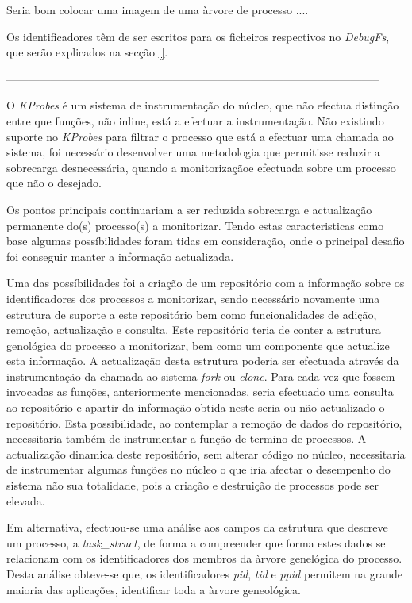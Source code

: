 Seria bom colocar uma imagem de uma àrvore de processo .... 

Os identificadores têm de ser escritos para os ficheiros respectivos no \textit{DebugFs}, que serão explicados na secção \ref{}.

-----------------------------------------------------------------------------------------------------

O \textit{KProbes} é um sistema de instrumentação do núcleo, que não efectua distinção entre que funções, não inline, está a efectuar a instrumentação.
Não existindo suporte no \textit{KProbes} para filtrar o processo que está a efectuar uma chamada ao sistema, foi necessário desenvolver uma metodologia que permitisse reduzir a sobrecarga desnecessária, quando a monitorizaçãoe efectuada sobre um processo que não o desejado.

Os pontos principais continuariam a ser reduzida sobrecarga e actualização permanente do(s) processo(s) a monitorizar.
Tendo estas caracteristicas como base algumas possíbilidades foram tidas em consideração, onde o principal desafio foi conseguir manter a informação actualizada.

Uma das possíbilidades foi a criação de um repositório com a informação sobre os identificadores dos processos a monitorizar, sendo necessário novamente uma estrutura de suporte a este repositório bem como funcionalidades de adição, remoção, actualização e consulta.
Este repositório teria de conter a estrutura genológica do processo a monitorizar, bem como um componente que actualize esta informação.
A actualização desta estrutura poderia ser efectuada através da instrumentação da chamada ao sistema \textit{fork} ou \textit{clone}.
Para cada vez que fossem invocadas as funções, anteriormente mencionadas, seria efectuado uma consulta ao repositório e apartir da informação obtida neste seria ou não actualizado o repositório.
Esta possibilidade, ao contemplar a remoção de dados do repositório, necessitaria também de instrumentar a função de termino de processos.
A actualização dinamica deste repositório, sem alterar código no núcleo, necessitaria de instrumentar algumas funções no núcleo o que iria afectar o desempenho do sistema não sua totalidade, pois a criação e destruição de processos pode ser elevada.

Em alternativa, efectuou-se uma análise aos campos da estrutura que descreve um processo, a \textit{task\_struct}, de forma a compreender que forma estes dados se relacionam com os identificadores dos membros da àrvore genelógica do processo.
Desta análise obteve-se que, os identificadores \textit{pid}, \textit{tid} e \textit{ppid} permitem na grande maioria das aplicações, identificar toda a àrvore geneológica.



